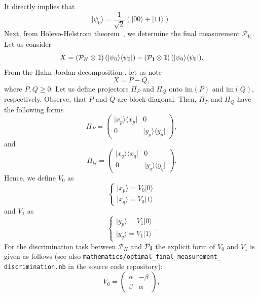 \documentclass[preprint,12pt, a4paper, dvipsnames]{elsarticle}
\newcommand{\ket}[1]{\ensuremath{|#1\rangle}}
\newcommand{\bra}[1]{\ensuremath{\langle#1|}}
\newcommand{\ketbra}[2]{\ensuremath{\ket{#1}\bra{#2}}}
\newcommand{\proj}[1]{\ensuremath{\ketbra{#1}{#1}}}
\newcommand{\1}{{\rm 1\hspace{-0.9mm}l}}
\newcommand{\Id}{{\rm 1\hspace{-0.9mm}l}}
\newcommand{\PP}{\mathcal{P}}
\theoremstyle{definition}
\begin{document}
 It directly implies that
 \begin{equation}
 \ket{\psi_0} = \frac{1}{\sqrt{2}}(\ket{00} + \ket{11}).  \end{equation}
 Next, from Holevo-Helstrom theorem~\cite{watrous}, we determine the final measurement $\PP_{V_i}$.
 Let us consider \begin{equation}
 X = \left(\PP_{H} \otimes \Id \right)(\proj{\psi_0}) - \left(\PP_{\Id} \otimes \Id \right) (\proj{\psi_0}).
  \end{equation}
 From the Hahn-Jordan decomposition \cite{watrous}, let us note
 \begin{equation}
 X = P - Q,
 \end{equation}
 where $P, Q \ge 0 $.
 Let us define projectors $\Pi_P$ and $\Pi_Q$ onto  $\text{im}(P)$ and $\text{im}(Q)$,
 respectively. Observe, that $P $ and $Q$ are block-diagonal.  Then,  $\Pi_P$ and $\Pi_Q$ have the following forms
 \begin{equation}
 \Pi_P = \left(\begin{array}{cc}\proj{x_p}&0\\0&\proj{y_p}\end{array}\right),
 \end{equation}
 and
 \begin{equation}
 \Pi_Q = \left(\begin{array}{cc}\proj{x_q}&0\\0&\proj{y_q}\end{array}\right).
 \end{equation}
 Hence, we define $V_0$ as
 \begin{equation}
 \begin{cases} \ket{x_p} =  V_0  \ket{0} \\  \ket{x_q} =  V_0 \ket{1} \end{cases}
 \end{equation}
 and $V_1$ as
 \begin{equation}
 \begin{cases}
 \ket{y_p} =   V_1 \ket{0} \\
  \ket{y_q} = V_1  \ket{1}
 \end{cases}.
 \end{equation}
 For the discrimination task between $\PP_{H}$ and $\PP_{\Id}$ the explicit form of $V_0$ and $V_1$ is given as follows (see also \texttt{mathematics/optimal\_final\_measurement\_ \\ discrimination.nb} in the source code repository):
 \begin{equation}
 V_0 =
 \left(\begin{array}{cc} \alpha & -\beta\\ \beta & \alpha \end{array}\right),
 \end{equation}
\end{document}
